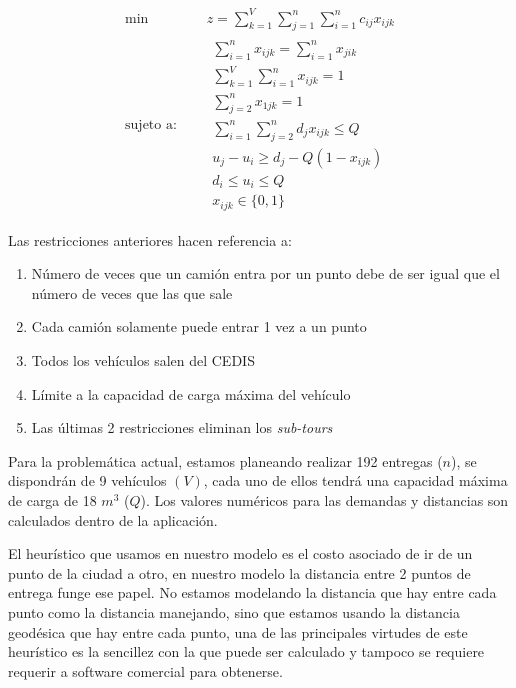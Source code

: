 \documentclass[journal]{IEEEtran}
\begin{document}
        \begin{equation*}
            \begin{aligned}
                \text{min } \quad & z = \sum_{k=1}^{V} \sum_{j=1}^{n} \sum_{i=1}^{n} c_{ij} x_{ijk}\\
                \text{sujeto a: }\quad &
                \begin{array}{c}
                    \displaystyle\sum_{i=1}^{n} x_{ijk} = \sum_{i=1}^{n} x_{jik} \\[3pt]
                    \displaystyle\sum_{k=1}^{V} \sum_{i=1}^{n} x_{ijk} = 1 \\[3pt]
                    \displaystyle\sum_{j=2}^{n} x_{1jk} = 1 \\[3pt]
                    \displaystyle\sum_{i=1}^{n} \sum_{j=2}^{n} d_{j} x_{ijk} \leq Q \\[3pt]
                    u_{j} - u_{i} \geq d_j - Q (1 - x_{ijk}) \\[3pt]
                    d_i \leq u_i \leq Q \\[3pt]
                    x_{ijk} \in \{0, 1\}
                \end{array}
            \end{aligned}
        \end{equation*}
        
        Las restricciones anteriores hacen referencia a:
        \begin{enumerate}
            \item Número de veces que un camión entra por un punto debe de ser igual que el número de veces que las que sale
            \item Cada camión solamente puede entrar 1 vez a un punto
            \item Todos los vehículos salen del CEDIS
            \item Límite a la capacidad de carga máxima del vehículo
            \item Las últimas 2 restricciones eliminan los \emph{sub-tours}
        \end{enumerate}
        
        Para la problemática actual, estamos planeando realizar 192 entregas ($n$), se dispondrán de 9 vehículos $(V)$, cada uno de ellos tendrá una capacidad máxima de carga de 18 $m^3$ ($Q$). Los valores numéricos para las demandas y distancias son calculados dentro de la aplicación.
        
        El heurístico que usamos en nuestro modelo es el costo asociado de ir de un punto de la ciudad a otro, en nuestro modelo la distancia entre 2 puntos de entrega funge ese papel. No estamos modelando la distancia que hay entre cada punto como la distancia manejando, sino que estamos usando la distancia geodésica que hay entre cada punto, una de las principales virtudes de este heurístico es la sencillez con la que puede ser calculado y tampoco se requiere requerir a software comercial para obtenerse. 
        
\end{document}
